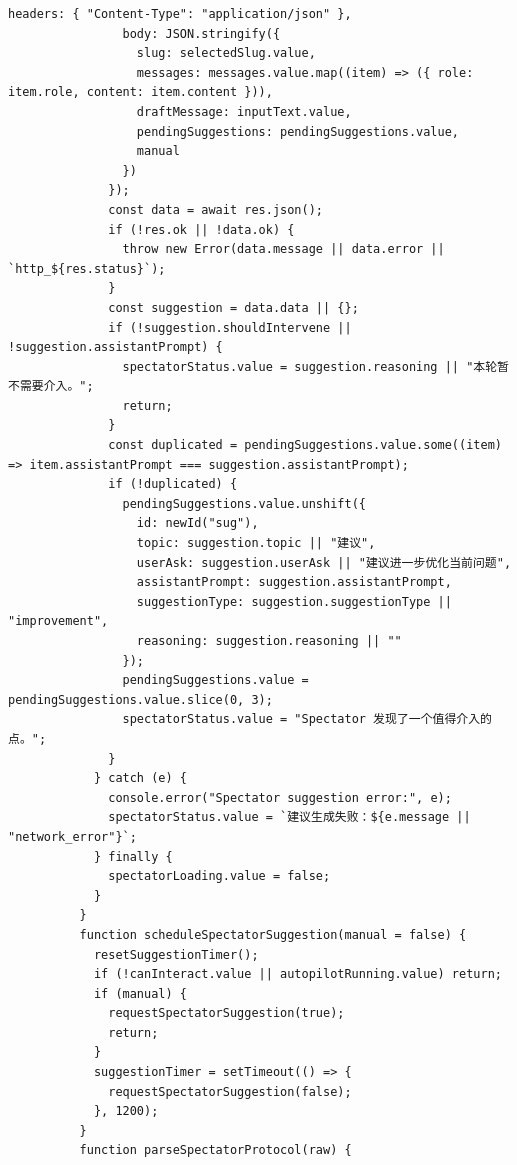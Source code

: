 \documentclass[12pt,a4paper]{article}
\begin{document}
\newpage
{}
\fancyhead[R]{}
\begin{Verbatim}[fontsize=\footnotesize]
                headers: { "Content-Type": "application/json" },
                body: JSON.stringify({
                  slug: selectedSlug.value,
                  messages: messages.value.map((item) => ({ role: item.role, content: item.content })),
                  draftMessage: inputText.value,
                  pendingSuggestions: pendingSuggestions.value,
                  manual
                })
              });
              const data = await res.json();
              if (!res.ok || !data.ok) {
                throw new Error(data.message || data.error || `http_${res.status}`);
              }
              const suggestion = data.data || {};
              if (!suggestion.shouldIntervene || !suggestion.assistantPrompt) {
                spectatorStatus.value = suggestion.reasoning || "本轮暂不需要介入。";
                return;
              }
              const duplicated = pendingSuggestions.value.some((item) => item.assistantPrompt === suggestion.assistantPrompt);
              if (!duplicated) {
                pendingSuggestions.value.unshift({
                  id: newId("sug"),
                  topic: suggestion.topic || "建议",
                  userAsk: suggestion.userAsk || "建议进一步优化当前问题",
                  assistantPrompt: suggestion.assistantPrompt,
                  suggestionType: suggestion.suggestionType || "improvement",
                  reasoning: suggestion.reasoning || ""
                });
                pendingSuggestions.value = pendingSuggestions.value.slice(0, 3);
                spectatorStatus.value = "Spectator 发现了一个值得介入的点。";
              }
            } catch (e) {
              console.error("Spectator suggestion error:", e);
              spectatorStatus.value = `建议生成失败：${e.message || "network_error"}`;
            } finally {
              spectatorLoading.value = false;
            }
          }
          function scheduleSpectatorSuggestion(manual = false) {
            resetSuggestionTimer();
            if (!canInteract.value || autopilotRunning.value) return;
            if (manual) {
              requestSpectatorSuggestion(true);
              return;
            }
            suggestionTimer = setTimeout(() => {
              requestSpectatorSuggestion(false);
            }, 1200);
          }
          function parseSpectatorProtocol(raw) {
\end{Verbatim}
\end{document}
